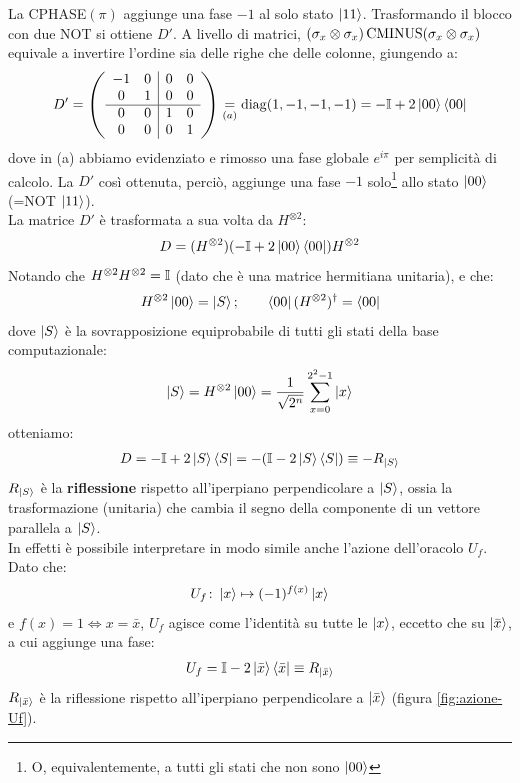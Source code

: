 \documentclass[../../InformazioneQuantistica.tex]{subfiles}
\begin{document}
La CPHASE$(\pi)$ aggiunge una fase $-1$ al solo stato $\Ket{11}$. Trasformando il blocco con due NOT si ottiene $D'$. A livello di matrici, $(\sigma_x \otimes \sigma_x) \operatorname{CMINUS} (\sigma_x \otimes \sigma_x)$ equivale a invertire l'ordine sia delle righe che delle colonne, giungendo a:
\begin{align*}
D' = \left( \begin{array}{cc|cc}
-1 & 0 & 0 & 0\\
0 & 1 & 0 & 0\\ \hline
0 & 0 & 1 & 0\\
0 & 0 & 0 & 1
\end{array}\right) \underset{(a)}{=} \operatorname{diag}(1,-1,-1,-1)= -\mathbb{I} + 2\Ket{00}\Bra{00}
\end{align*}
dove in (a) abbiamo evidenziato e rimosso una fase globale $e^{i\pi}$ per semplicità di calcolo. La $D'$ così ottenuta, perciò, aggiunge una fase $-1$ solo\footnote{O, equivalentemente, a tutti gli stati che non sono $\Ket{00}$} allo stato $\Ket{00}$ (=NOT $\Ket{11}$).\\

La matrice $D'$ è trasformata a sua volta da $H^{\otimes 2}$:
\begin{align*}
    D = (H^{\otimes 2}) (-\mathbb{I} + 2\Ket{00}\Bra{00}) H^{\otimes 2}
\end{align*}
Notando che $H^{\otimes 2} H^{\otimes 2} = \mathbb{I}$ (dato che è una matrice hermitiana unitaria), e che:
\begin{align*}
    H^{\otimes 2} \Ket{00} = \Ket{S}; \qquad \Bra{00}(H^{\otimes 2})^\dag = \Bra{00}
\end{align*}
dove $\Ket{S}$ è la sovrapposizione equiprobabile di tutti gli stati della base computazionale:
\begin{align*}
    \Ket{S} = H^{\otimes 2} \Ket{00} = \frac{1}{\sqrt{2^n}}\sum_{x=0}^{2^2-1} \Ket{x}
\end{align*}
otteniamo:
\begin{align*}
    D = -\mathbb{I} + 2\Ket{S}\Bra{S} = -(\mathbb{I} - 2\Ket{S}\Bra{S}) \equiv - R_{\Ket{S}}
\end{align*}
$R_{\Ket{S}}$ è la \textbf{riflessione} rispetto all'iperpiano perpendicolare a $\Ket{S}$, ossia la trasformazione (unitaria) che cambia il segno della componente di un vettore parallela a $\Ket{S}$.\\

In effetti è possibile interpretare in modo simile anche l'azione dell'oracolo $U_f$. Dato che:
\begin{align*}
    U_f \colon \Ket{x} \mapsto (-1)^{f(x)}\Ket{x}
\end{align*}
e $f(x)=1 \Leftrightarrow x=\bar{x}$, $U_f$ agisce come l'identità su tutte le $\Ket{x}$, eccetto che su $\Ket{\bar{x}}$, a cui aggiunge una fase:
\begin{align*}
    U_f = \mathbb{I} - 2\Ket{\bar{x}}\Bra{\bar{x}} \equiv R_{\Ket{\bar{x}}}
\end{align*}
$R_{\Ket{\bar{x}}}$ è la riflessione rispetto all'iperpiano perpendicolare a $\Ket{\bar{x}}$ (figura \ref{fig:azione-Uf}).
\end{document}
